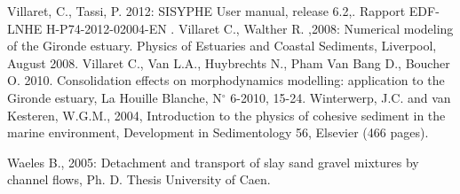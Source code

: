 Villaret, C., Tassi, P. 2012{\nobreakspace}: SISYPHE User manual, release
6.2,. Rapport EDF-LNHE H-P74-2012-02004-EN .\newline
Villaret C., Walther R. ,2008: Numerical modeling of the Gironde estuary.
Physics of Estuaries and Coastal Sediments, Liverpool, August 2008.\newline
Villaret C., Van L.A., Huybrechts N., Pham Van Bang D., Boucher O. 2010.
Consolidation effects on morphodynamics modelling: application to the
Gironde estuary, La Houille Blanche, N$^\circ$ 6-2010, 15-24.\newline
Winterwerp, J.C. and van Kesteren, W.G.M., 2004, Introduction to the physics
of cohesive sediment in the marine environment, Development in Sedimentology
56, Elsevier (466 pages).

Waeles B., 2005: Detachment and transport of slay sand gravel mixtures by
channel flows, Ph. D. Thesis University of Caen.

